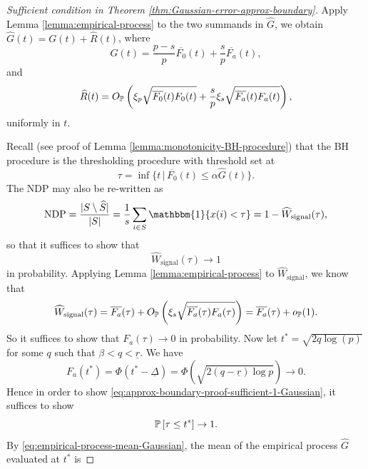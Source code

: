 \begin{proof}[Sufficient condition in Theorem \ref{thm:Gaussian-error-approx-boundary}]
Apply Lemma \ref{lemma:empirical-process} to the two summands in $\widehat{G}$, we obtain
$\widehat{G}(t) = G(t) + \widehat{R}(t)$,
where 
\begin{equation} \label{eq:empirical-process-mean-Gaussian}
    G(t) = \frac{p-s}{p}\overline{F_0}(t) + \frac{s}{p}\overline{F_a}(t),
\end{equation}
and 
\begin{equation} \label{eq:empirical-process-residual-Gaussian}
    \widehat{R}(t) = O_\P\left(\xi_p\sqrt{\overline{F_0}(t)F_0(t)} + \frac{s}{p}\xi_s\sqrt{\overline{F_a}(t)F_a(t)}\right),
\end{equation}
uniformly in $t$.

Recall (see proof of Lemma \ref{lemma:monotonicity-BH-procedure}) that the BH procedure is the thresholding procedure with threshold set at 
\begin{equation} \label{eq:approx-boundary-proof-tau-Gaussian}
    \tau = \inf\{t\,|\,\overline{F_0}(t)\le\alpha\widehat{G}(t)\}. 
\end{equation}
The NDP may also be re-written as 
$$
\text{NDP} = \frac{|{S}\setminus\widehat{S}|}{|{S}|} = \frac{1}{s}\sum_{i\in S}\mathbbm{1}\{x(i) < \tau\} = 1 - \widehat{W}_\text{signal}(\tau),
$$
so that it suffices to show that 
\begin{equation} \label{eq:approx-boundary-proof-sufficient-1-Gaussian}
    \widehat{W}_\text{signal}(\tau)\to 1
\end{equation} in probability.
Applying Lemma \ref{lemma:empirical-process} to $\widehat{W}_\text{signal}$, we know that 
$$
\widehat{W}_\text{signal}(\tau) = \overline{F_a}(\tau) + O_\P\left(\xi_s\sqrt{\overline{F_a}(\tau)F_a(\tau)}\right) = \overline{F_a}(\tau) + o_\P(1).
$$
So it suffices to show that $F_a(\tau)\to 0$ in probability.
Now let $t^* = \sqrt{2q\log(p)}$ for some $q$ such that $\beta<q<\underline{r}$.
We have 
\begin{equation} \label{eq:approx-boundary-proof-sufficient-2-Gaussian}
    F_a(t^*) 
    = \Phi(t^* - \underline{\Delta}) 
    = \Phi(\sqrt{2(q - \underline{r})\log{p}}) \to 0. 
\end{equation}
Hence in order to show \eqref{eq:approx-boundary-proof-sufficient-1-Gaussian}, it suffices to show 
\begin{equation} \label{eq:approx-boundary-proof-sufficient-3-Gaussian}
    \P\left[\tau \le t^*\right] \to 1.
\end{equation}
By \eqref{eq:empirical-process-mean-Gaussian}, the mean of the empirical process $\widehat{G}$ evaluated at $t^*$ is

\end{proof}
